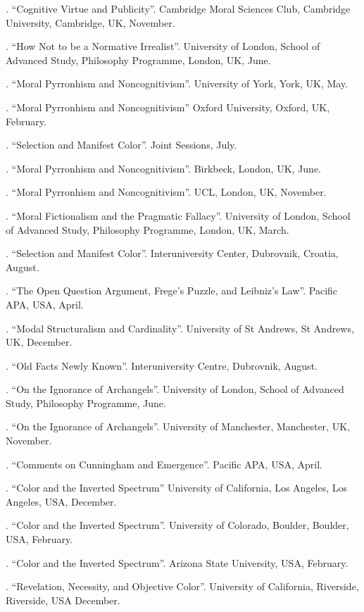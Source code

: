 \documentclass[11pt]{article}
\begin{document}
. ``Cognitive Virtue and Publicity''. Cambridge Moral Sciences Club, Cambridge University, Cambridge, UK, November.

. ``How Not to be a Normative Irrealist''. University of London, School of Advanced Study, Philosophy Programme, London, UK, June.

. ``Moral Pyrronhism and Noncognitivism''. University of York, York, UK, May.

. ``Moral Pyrronhism and Noncognitivism'' Oxford University, Oxford, UK, February.

. ``Selection and Manifest Color''. Joint Sessions, July.

. ``Moral Pyrronhism and Noncognitivism''. Birkbeck, London, UK, June.

. ``Moral Pyrronhism and Noncognitivism''. UCL, London, UK, November.

. ``Moral Fictionalism and the Pragmatic Fallacy''. University of London, School of Advanced Study, Philosophy Programme, London, UK, March.

. ``Selection and Manifest Color''. Interuniversity Center, Dubrovnik, Croatia, August.

. ``The Open Question Argument, Frege's Puzzle, and Leibniz's Law''. Pacific APA, USA, April.

. ``Modal Structuralism and Cardinality''.  University of St Andrews, St Andrews, UK, December.

. ``Old Facts Newly Known''. Interuniversity Centre, Dubrovnik, August.

. ``On the Ignorance of Archangels''. University of London, School of Advanced Study, Philosophy Programme, June.

. ``On the Ignorance of Archangels''. University of Manchester, Manchester, UK, November.

. ``Comments on Cunningham and Emergence''. Pacific APA, USA, April.

. ``Color and the Inverted Spectrum'' University of California, Los Angeles, Los Angeles, USA, December.

. ``Color and the Inverted Spectrum''. University of Colorado, Boulder, Boulder, USA, February.

. ``Color and the Inverted Spectrum''. Arizona State University, USA, February.

. ``Revelation, Necessity, and Objective Color''. University of California, Riverside, Riverside, USA December.
\end{document}
